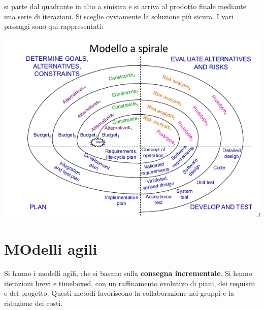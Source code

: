\documentclass[a4paper,12pt, oneside]{book}
\begin{document}
si parte dal quadrante in alto a sinistra e si arriva al prodotto finale mediante una serie di iterazioni. Si sceglie ovviamente la soluzione più sicura. I vari passaggi sono qui rappresentati:
\begin{center}
\includegraphics[scale=0.7]{img/ms3.png}
\end{center}
\section{MOdelli agili}
Si hanno i modelli agili, che si basano sulla \textbf{consegna incrementale}. Si hanno iterazioni brevi e timeboxed, con un raffinamento evolutivo di piani, dei requisiti e del progetto. Questi metodi favoriscono la collaborazione nei gruppi e la riduzione dei costi.
\end{document}
